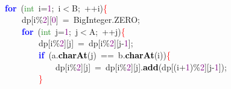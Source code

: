 {{\mbox{}\  \\
\mbox{}\ \ \ \ \ \ \ \ \ \ \ \ \ \ \ \ \textbf{\textcolor{Blue}{for}}\ \textcolor{BrickRed}{(}\textcolor{ForestGreen}{int}\ i\textcolor{BrickRed}{=}\textcolor{Purple}{1}\textcolor{BrickRed}{;}\ i\textcolor{BrickRed}{$<$}B\textcolor{BrickRed}{;}\ \textcolor{BrickRed}{++}i\textcolor{BrickRed}{)}\textcolor{Red}{\{} \\
\mbox{}\ \ \ \ \ \ \ \ \ \ \ \ \ \ \ \ \ \ \ \ dp\textcolor{BrickRed}{[}i\textcolor{BrickRed}{\%}\textcolor{Purple}{2}\textcolor{BrickRed}{][}\textcolor{Purple}{0}\textcolor{BrickRed}{]}\ \textcolor{BrickRed}{=}\ BigInteger\textcolor{BrickRed}{.}ZERO\textcolor{BrickRed}{;} \\
\mbox{}\ \ \ \ \ \ \ \ \ \ \ \ \ \ \ \ \ \ \ \ \textbf{\textcolor{Blue}{for}}\ \textcolor{BrickRed}{(}\textcolor{ForestGreen}{int}\ j\textcolor{BrickRed}{=}\textcolor{Purple}{1}\textcolor{BrickRed}{;}\ j\textcolor{BrickRed}{$<$}A\textcolor{BrickRed}{;}\ \textcolor{BrickRed}{++}j\textcolor{BrickRed}{)}\textcolor{Red}{\{} \\
\mbox{}\ \ \ \ \ \ \ \ \ \ \ \ \ \ \ \ \ \ \ \ \ \ \ \ dp\textcolor{BrickRed}{[}i\textcolor{BrickRed}{\%}\textcolor{Purple}{2}\textcolor{BrickRed}{][}j\textcolor{BrickRed}{]}\ \textcolor{BrickRed}{=}\ dp\textcolor{BrickRed}{[}i\textcolor{BrickRed}{\%}\textcolor{Purple}{2}\textcolor{BrickRed}{][}j\textcolor{BrickRed}{-}\textcolor{Purple}{1}\textcolor{BrickRed}{];} \\
\mbox{}\ \ \ \ \ \ \ \ \ \ \ \ \ \ \ \ \ \ \ \ \ \ \ \ \textbf{\textcolor{Blue}{if}}\ \textcolor{BrickRed}{(}a\textcolor{BrickRed}{.}\textbf{\textcolor{Black}{charAt}}\textcolor{BrickRed}{(}j\textcolor{BrickRed}{)}\ \textcolor{BrickRed}{==}\ b\textcolor{BrickRed}{.}\textbf{\textcolor{Black}{charAt}}\textcolor{BrickRed}{(}i\textcolor{BrickRed}{))}\textcolor{Red}{\{} \\
\mbox{}\ \ \ \ \ \ \ \ \ \ \ \ \ \ \ \ \ \ \ \ \ \ \ \ \ \ \ \ dp\textcolor{BrickRed}{[}i\textcolor{BrickRed}{\%}\textcolor{Purple}{2}\textcolor{BrickRed}{][}j\textcolor{BrickRed}{]}\ \textcolor{BrickRed}{=}\ dp\textcolor{BrickRed}{[}i\textcolor{BrickRed}{\%}\textcolor{Purple}{2}\textcolor{BrickRed}{][}j\textcolor{BrickRed}{].}\textbf{\textcolor{Black}{add}}\textcolor{BrickRed}{(}dp\textcolor{BrickRed}{[(}i\textcolor{BrickRed}{+}\textcolor{Purple}{1}\textcolor{BrickRed}{)\%}\textcolor{Purple}{2}\textcolor{BrickRed}{][}j\textcolor{BrickRed}{-}\textcolor{Purple}{1}\textcolor{BrickRed}{]);} \\
\mbox{}\ \ \ \ \ \ \ \ \ \ \ \ \ \ \ \ \ \ \ \ \ \ \ \ \textcolor{Red}{\}} \\
}}
